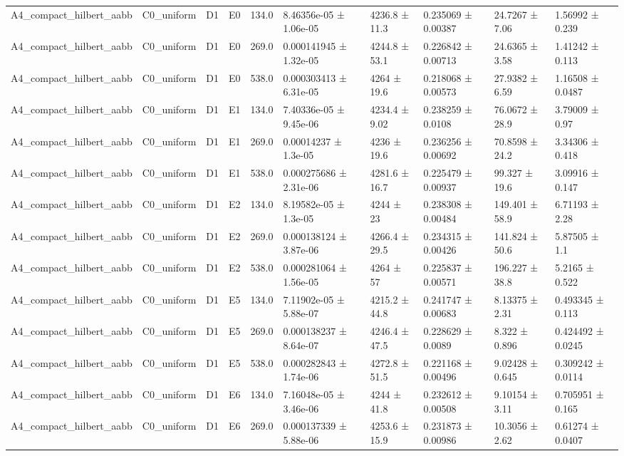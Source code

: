 \begin{table}
\begin{tabular}{llllllllll}
A4\_compact\_hilbert\_aabb & C0\_uniform & D1 & E0 & 134.0 & 8.46356e-05 ± 1.06e-05 & 4236.8 ± 11.3 & 0.235069 ± 0.00387 & 24.7267 ± 7.06 & 1.56992 ± 0.239 \\
A4\_compact\_hilbert\_aabb & C0\_uniform & D1 & E0 & 269.0 & 0.000141945 ± 1.32e-05 & 4244.8 ± 53.1 & 0.226842 ± 0.00713 & 24.6365 ± 3.58 & 1.41242 ± 0.113 \\
A4\_compact\_hilbert\_aabb & C0\_uniform & D1 & E0 & 538.0 & 0.000303413 ± 6.31e-05 & 4264 ± 19.6 & 0.218068 ± 0.00573 & 27.9382 ± 6.59 & 1.16508 ± 0.0487 \\
A4\_compact\_hilbert\_aabb & C0\_uniform & D1 & E1 & 134.0 & 7.40336e-05 ± 9.45e-06 & 4234.4 ± 9.02 & 0.238259 ± 0.0108 & 76.0672 ± 28.9 & 3.79009 ± 0.97 \\
A4\_compact\_hilbert\_aabb & C0\_uniform & D1 & E1 & 269.0 & 0.00014237 ± 1.3e-05 & 4236 ± 19.6 & 0.236256 ± 0.00692 & 70.8598 ± 24.2 & 3.34306 ± 0.418 \\
A4\_compact\_hilbert\_aabb & C0\_uniform & D1 & E1 & 538.0 & 0.000275686 ± 2.31e-06 & 4281.6 ± 16.7 & 0.225479 ± 0.00937 & 99.327 ± 19.6 & 3.09916 ± 0.147 \\
A4\_compact\_hilbert\_aabb & C0\_uniform & D1 & E2 & 134.0 & 8.19582e-05 ± 1.3e-05 & 4244 ± 23 & 0.238308 ± 0.00484 & 149.401 ± 58.9 & 6.71193 ± 2.28 \\
A4\_compact\_hilbert\_aabb & C0\_uniform & D1 & E2 & 269.0 & 0.000138124 ± 3.87e-06 & 4266.4 ± 29.5 & 0.234315 ± 0.00426 & 141.824 ± 50.6 & 5.87505 ± 1.1 \\
A4\_compact\_hilbert\_aabb & C0\_uniform & D1 & E2 & 538.0 & 0.000281064 ± 1.56e-05 & 4264 ± 57 & 0.225837 ± 0.00571 & 196.227 ± 38.8 & 5.2165 ± 0.522 \\
A4\_compact\_hilbert\_aabb & C0\_uniform & D1 & E5 & 134.0 & 7.11902e-05 ± 5.88e-07 & 4215.2 ± 44.8 & 0.241747 ± 0.00683 & 8.13375 ± 2.31 & 0.493345 ± 0.113 \\
A4\_compact\_hilbert\_aabb & C0\_uniform & D1 & E5 & 269.0 & 0.000138237 ± 8.64e-07 & 4246.4 ± 47.5 & 0.228629 ± 0.0089 & 8.322 ± 0.896 & 0.424492 ± 0.0245 \\
A4\_compact\_hilbert\_aabb & C0\_uniform & D1 & E5 & 538.0 & 0.000282843 ± 1.74e-06 & 4272.8 ± 51.5 & 0.221168 ± 0.00496 & 9.02428 ± 0.645 & 0.309242 ± 0.0114 \\
A4\_compact\_hilbert\_aabb & C0\_uniform & D1 & E6 & 134.0 & 7.16048e-05 ± 3.46e-06 & 4244 ± 41.8 & 0.232612 ± 0.00508 & 9.10154 ± 3.11 & 0.705951 ± 0.165 \\
A4\_compact\_hilbert\_aabb & C0\_uniform & D1 & E6 & 269.0 & 0.000137339 ± 5.88e-06 & 4253.6 ± 15.9 & 0.231873 ± 0.00986 & 10.3056 ± 2.62 & 0.61274 ± 0.0407 \\

\end{tabular}
\end{table}
